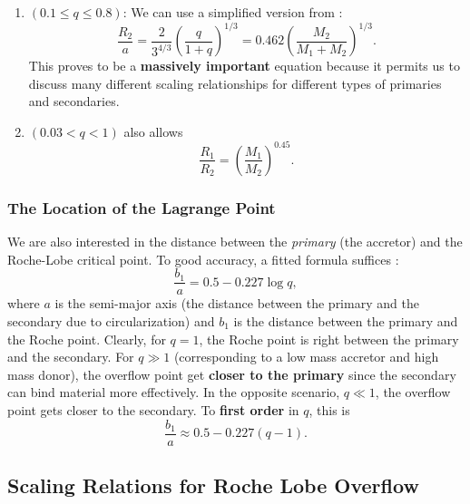 \begin{enumerate}
    \item $(0.1 \le q \le 0.8)$: We can use a simplified version from \citet{1971ARA&A...9..183P}:
    \begin{equation}
        \label{eq:paczynski_lobe_radius}
        \boxed{
        \frac{R_2}{a} = \frac{2}{3^{4/3}}\left(\frac{q}{1+q}\right)^{1/3} = 0.462\left(\frac{M_2}{M_1+M_2}\right)^{1/3}.}
    \end{equation}
This proves to be a \textbf{massively important} equation because it permits us to discuss many different scaling relationships for different types of primaries and secondaries.
    \item $(0.03 < q < 1)$ also allows
\[
\frac{R_1}{R_2} = \left(\frac{M_1}{M_2}\right)^{0.45}.
\]

\end{enumerate}

\subsubsection{The Location of the Lagrange Point}

We are also interested in the distance between the \textit{primary} (the accretor) and the Roche-Lobe critical point. To good accuracy, a fitted formula suffices \citep{1964BAICz..15..165P}:
\begin{equation}
    \label{eq:roche_overflow_distance}
    \frac{b_1}{a} = 0.5 - 0.227 \log q,
\end{equation}
where $a$ is the semi-major axis (the distance between the primary and the secondary due to circularization) and $b_1$ is the distance between the primary and the Roche point. Clearly, for $q = 1$, the Roche point is right between the primary and the secondary. For $q \gg 1$ (corresponding to a low mass accretor and high mass donor), the overflow point get \textbf{closer to the primary} since the secondary can bind material more effectively. In the opposite scenario, $q \ll 1$, the overflow point gets closer to the secondary. To \textbf{first order} in $q$, this is
\[
\frac{b_1}{a} \approx 0.5 - 0.227(q-1).
\]
\subsection{Scaling Relations for Roche Lobe Overflow}

